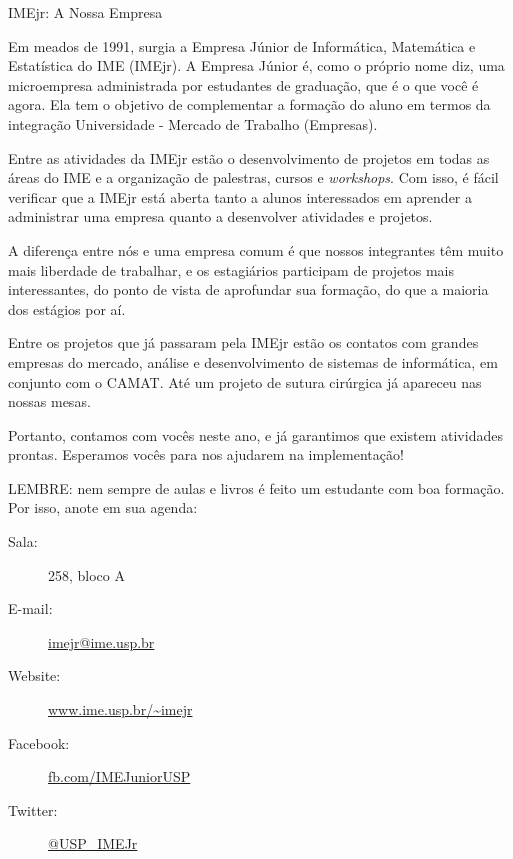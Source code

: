\begin{secao}{IMEjr: A Nossa Empresa}

Em meados de 1991, surgia a Empresa Júnior de Informática, Matemática
e Estatística do IME (IMEjr). A Empresa Júnior é, como o próprio nome
diz, uma microempresa administrada por estudantes de graduação, que é
o que você é agora. Ela tem o objetivo de complementar a formação do
aluno em termos da integração Universidade - Mercado de Trabalho
(Empresas).

Entre as atividades da IMEjr estão o desenvolvimento de
projetos em todas as áreas do IME e a organização de palestras, cursos
e \textit{workshops}. Com isso, é fácil verificar que a IMEjr está aberta tanto
a alunos interessados em aprender a administrar uma empresa quanto a
desenvolver atividades e projetos.

A diferença entre nós e uma
empresa comum é que nossos integrantes têm muito mais liberdade de
trabalhar, e os estagiários participam de projetos mais interessantes,
do ponto de vista de aprofundar sua formação, do que a maioria dos
estágios por aí.

Entre os projetos que já passaram pela IMEjr estão
os contatos com grandes empresas do mercado, análise e desenvolvimento
de sistemas de informática, em conjunto com o CAMAT. Até um projeto
de sutura cirúrgica já apareceu nas nossas mesas.

Portanto, contamos
com vocês neste ano, e já garantimos que existem atividades
prontas. Esperamos vocês para nos ajudarem na implementação!

LEMBRE: nem sempre de aulas e livros é feito um estudante com boa
formação. Por isso, anote em sua agenda: 
\begin{description}
\item [Sala:] 258, bloco A
\item[E-mail:] \url{imejr@ime.usp.br}
\item[Website:] \url{www.ime.usp.br/~imejr}
\item[Facebook:] \url{fb.com/IMEJuniorUSP}
\item[Twitter:] \url{@USP_IMEJr}
\end{description}

\end{secao}
